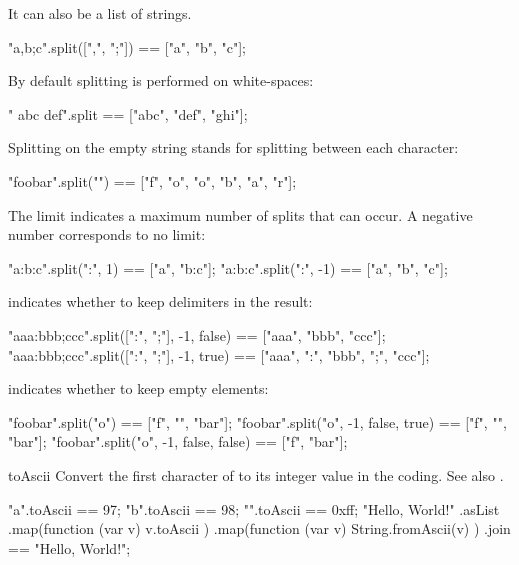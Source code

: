 \begin{urbiscriptapi}
\noindent
It can also be a list of strings.

\begin{urbiassert}
"a,b;c".split([",", ";"]) == ["a", "b", "c"];
\end{urbiassert}

\noindent
By default splitting is performed on white-spaces:

\begin{urbiassert}
"  abc  def\tghi\n".split == ["abc", "def", "ghi"];
\end{urbiassert}

\noindent
Splitting on the empty string stands for splitting between each character:

\begin{urbiassert}
"foobar".split("") == ["f", "o", "o", "b", "a", "r"];
\end{urbiassert}

The limit  indicates a maximum number of splits that can occur. A
negative number corresponds to no limit:

\begin{urbiassert}
"a:b:c".split(":",  1) == ["a", "b:c"];
"a:b:c".split(":", -1) == ["a", "b", "c"];
\end{urbiassert}

 indicates whether to keep delimiters in the result:

\begin{urbiassert}
"aaa:bbb;ccc".split([":", ";"], -1, false) == ["aaa",      "bbb",      "ccc"];
"aaa:bbb;ccc".split([":", ";"], -1, true)  == ["aaa", ":", "bbb", ";", "ccc"];
\end{urbiassert}

 indicates whether to keep empty elements:

\begin{urbiassert}
"foobar".split("o")                   == ["f", "", "bar"];
"foobar".split("o", -1, false, true)  == ["f", "", "bar"];
"foobar".split("o", -1, false, false) == ["f",     "bar"];
\end{urbiassert}


\item[toAscii] Convert the first character of \this to its integer value in
  the  coding.  See also .
\begin{urbiassert}
   "a".toAscii == 97;
   "b".toAscii == 98;
"\xff".toAscii == 0xff;
"Hello, World!\n"
  .asList
  .map(function (var v) { v.toAscii })
  .map(function (var v) { String.fromAscii(v) })
  .join
  == "Hello, World!\n";
\end{urbiassert}



\end{urbiscriptapi}
